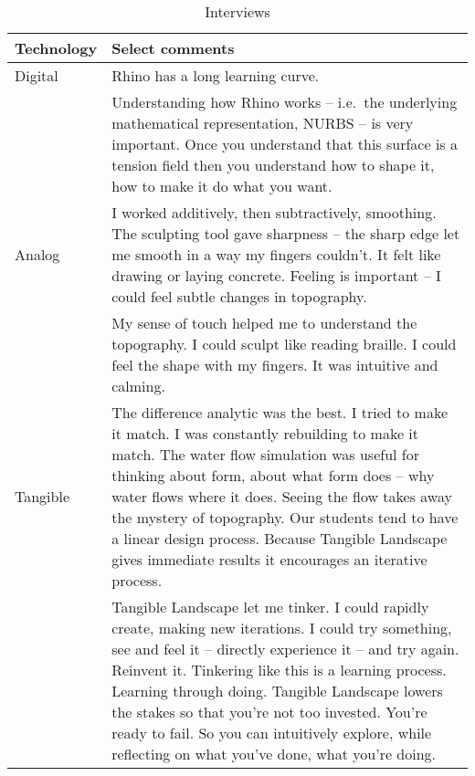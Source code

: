 \begin{table*}
\caption{Interviews}
\begin{tabular}{p{} p{ }}
\toprule
Technology & Select comments\\
\midrule
%
Digital
%
& Rhino has a long learning curve.\\
& Understanding how Rhino works 
-- i.e.~the underlying mathematical representation, NURBS -- is very important. 
Once you understand that this surface is a tension field 
then you understand how to shape it, how to make it do what you want.\\
%
Analog 
%
& I worked additively, then subtractively, smoothing.
The sculpting tool gave sharpness --
the sharp edge let me smooth in a way my fingers couldn't.
It felt like drawing or laying concrete.
Feeling is important -- I could feel subtle changes in topography.\\
& My sense of touch helped me to understand the topography.
I could sculpt like reading braille. I could feel the shape with my fingers.
It was intuitive and calming.\\
%
Tangible
% 
& The difference analytic was the best. 
I tried to make it match. 
I was constantly rebuilding to make it match.
The water flow simulation was useful for thinking about form, 
about what form does --  why water flows where it does.
Seeing the flow takes away the mystery of topography.
Our students tend to have a linear design process.
Because Tangible Landscape gives immediate results 
it encourages an iterative process. \\
& Tangible Landscape let me tinker. 
I could rapidly create, making new iterations. 
I could try something, see and feel it -- directly experience it --
and try again. Reinvent it.
Tinkering like this is a learning process. Learning through doing.
Tangible Landscape lowers the stakes so that you're not too invested.
You're ready to fail. So you can intuitively explore, 
while reflecting on what you've done,
what you're doing.\\
%
\bottomrule
\end{tabular}
\label{table:interviews}
\end{table*}